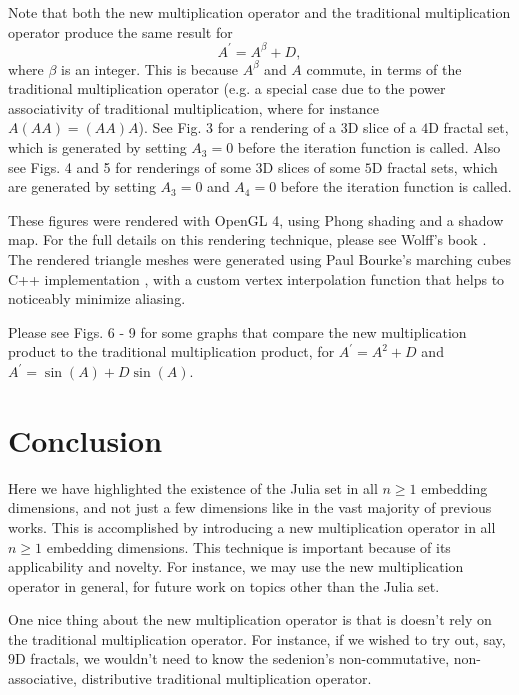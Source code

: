 \documentclass[12pt]{article}
\begin{document}
Note that both the new multiplication operator and the traditional multiplication operator produce the same result for
\begin{equation}
A^{\prime} = A^\beta + D, 
\end{equation}
where $\beta$ is an integer.
This is because $A^\beta$ and $A$ commute, in terms of the traditional multiplication operator (e.g. a special case due to the power associativity of traditional multiplication, where for instance $A(AA) = (AA)A$).
See Fig. 3 for a rendering of a $3$D slice of a $4$D fractal set, which is generated by setting $A_3 = 0$ before the iteration function is called.
Also see Figs. 4 and 5 for renderings of some $3$D slices of some $5$D fractal sets, which are generated by setting $A_3 = 0$ and $A_4 = 0$ before the iteration function is called.

These figures were rendered with OpenGL 4, using Phong shading and a shadow map.
For the full details on this rendering technique, please see Wolff's book \cite{wolff}.
The rendered triangle meshes were generated using Paul Bourke's marching cubes C++ implementation \cite{mc}, with a custom vertex interpolation function that helps to noticeably minimize aliasing.

Please see Figs. 6 - 9 for some graphs that compare the new multiplication product to the traditional multiplication product, for $A^{\prime} = A^2 + D$ and $A^{\prime} = \sin(A) + D \sin(A)$.





\section{Conclusion}

Here we have highlighted the existence of the Julia set in all $n \geq 1$ embedding dimensions, and not just a few dimensions like in the vast majority of previous works.
This is accomplished by introducing a new multiplication operator in all $n \geq 1$ embedding dimensions.
This technique is important because of its applicability and novelty.
For instance, we may use the new multiplication operator in general, for future work on topics other than the Julia set.

One nice thing about the new multiplication operator is that is doesn't rely on the traditional multiplication operator.
For instance, if we wished to try out, say, $9$D fractals, we wouldn't need to know the sedenion's non-commutative, non-associative, distributive traditional multiplication operator.
\end{document}
